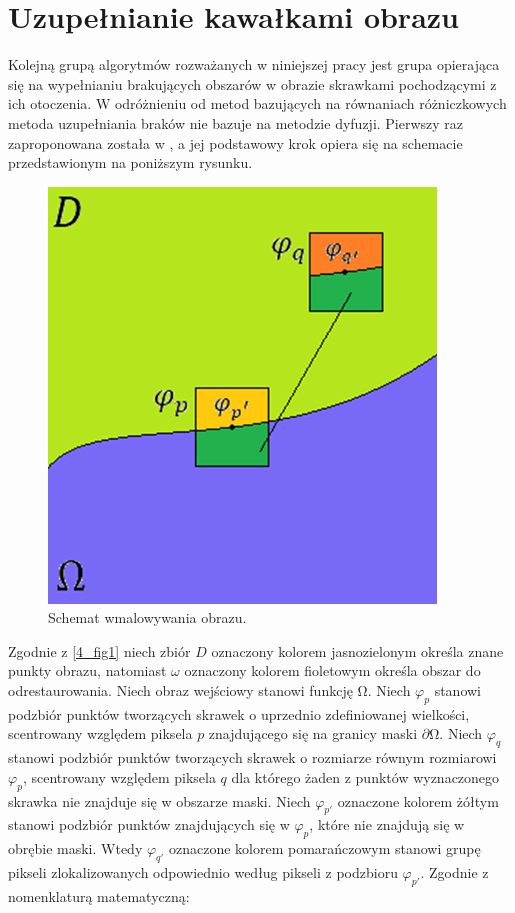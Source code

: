 \documentclass[12pt, twoside, openany]{report}
\theoremstyle{definition}
\begin{document}
\chapter{Uzupełnianie kawałkami obrazu}
Kolejną grupą algorytmów rozważanych w niniejszej pracy jest grupa opierająca się na wypełnianiu brakujących obszarów w obrazie skrawkami pochodzącymi z ich otoczenia. W odróżnieniu od metod bazujących na równaniach różniczkowych metoda uzupełniania braków nie bazuje na metodzie dyfuzji. Pierwszy raz zaproponowana została w \cite{efros1999texture}, a jej podstawowy krok opiera się na schemacie przedstawionym na poniższym rysunku.
\begin{figure}[!h]
	\centering
	\includegraphics[scale=0.5]{rysunki/4_fig1}
	\caption{Schemat wmalowywania obrazu.}
	\label{4_fig1}
\end{figure}
Zgodnie z \autoref{4_fig1} niech zbiór $D$ oznaczony kolorem jasnozielonym określa znane punkty obrazu, natomiast $\omega $ oznaczony kolorem fioletowym określa obszar do odrestaurowania. Niech obraz wejściowy stanowi funkcję $\mathrm{\Omega }$. Niech ${\varphi}_p$ stanowi podzbiór punktów tworzących skrawek o uprzednio zdefiniowanej wielkości, scentrowany względem piksela $p$ znajdującego się na granicy maski $\partial \mathrm{\Omega }$. Niech ${\varphi}_q$ stanowi podzbiór punktów tworzących skrawek o rozmiarze równym rozmiarowi ${\varphi}_p$, scentrowany względem piksela $q$ dla którego żaden z punktów wyznaczonego skrawka nie znajduje się w obszarze maski. Niech ${\varphi}_{p'}$ oznaczone kolorem żółtym stanowi podzbiór punktów znajdujących się w ${\varphi}_p$, które nie znajdują się w obrębie maski. Wtedy ${\varphi}_{q'}$ oznaczone kolorem pomarańczowym stanowi grupę pikseli zlokalizowanych odpowiednio według pikseli z podzbioru ${\varphi}_{p'}$. Zgodnie z nomenklaturą matematyczną:
\end{document}

